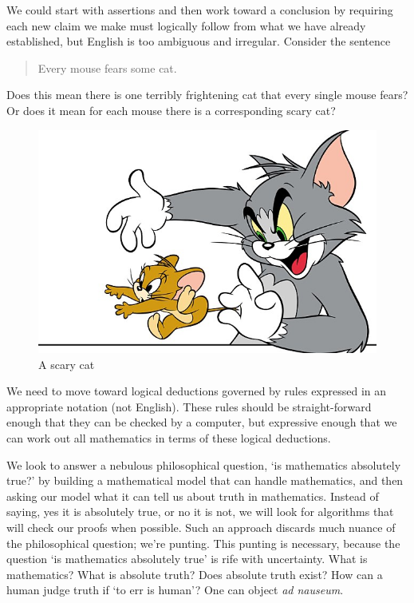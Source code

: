 \documentclass{scrbook}
\begin{document}
We could start with assertions and then work toward a conclusion by requiring each new claim we make must logically follow from what we have already established, but English is too ambiguous and irregular. Consider the sentence
\begin{quote}
  Every mouse fears some cat.
\end{quote}
Does this mean there is one terribly frightening cat that every single mouse fears? Or does it mean for each mouse there is a corresponding scary cat? \cite{wiki:cat-gen}
\begin{figure}
  \centering
  \includegraphics[width=\textwidth]{images/tom-jerry}
  \caption{A scary cat }
\end{figure}

We need to move toward logical deductions governed by rules expressed in an appropriate notation (not English). These rules should be straight-forward enough that they can be checked by a computer, but expressive enough that we can work out all mathematics in terms of these logical deductions. 

We look to answer a nebulous philosophical question, `is mathematics absolutely true?' by building a mathematical model that can handle mathematics, and then asking our model what it can tell us about truth in mathematics. Instead of saying, yes it is absolutely true, or no it is not, we will look for algorithms that will check our proofs when possible. Such an approach discards much nuance of the philosophical question; we're punting. This punting is necessary, because the question `is mathematics absolutely true' is rife with uncertainty. What is mathematics? What is absolute truth? Does absolute truth exist? How can a human judge truth if `to err is human'? One can object \emph{ad nauseum}.  
\end{document}
